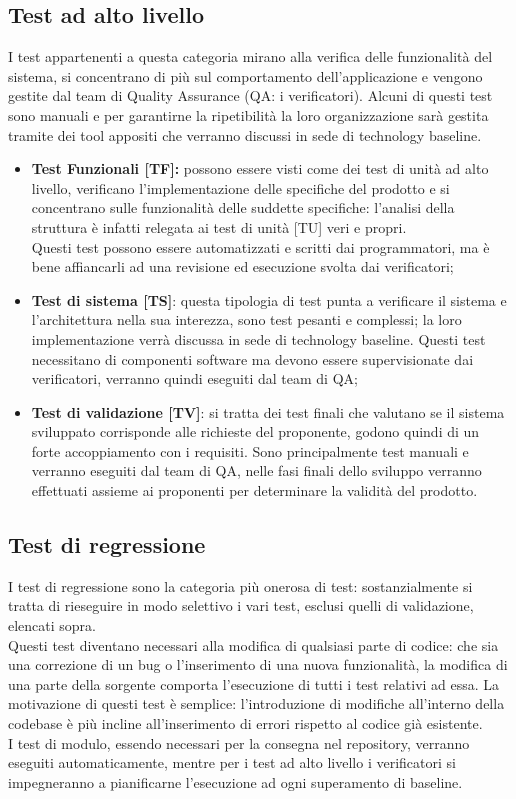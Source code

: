 \documentclass[PianoDiProgetto.tex]{subfiles}
\begin{document}
\subsection{Test ad alto livello}
I test appartenenti a questa categoria mirano alla verifica delle funzionalità del sistema, si concentrano di più sul comportamento dell'applicazione e vengono gestite dal team di Quality Assurance (QA: i verificatori).
Alcuni di questi test sono manuali e per garantirne la ripetibilità la loro organizzazione sarà gestita tramite dei tool appositi che verranno discussi in sede di technology baseline.
\begin{itemize}
	\item \textbf{Test Funzionali [TF]:} possono essere visti come dei test di unità ad alto livello, verificano l'implementazione delle specifiche del prodotto e si concentrano sulle funzionalità delle suddette specifiche: l'analisi della struttura è infatti relegata ai test di unità [TU] veri e propri. \\
	Questi test possono essere automatizzati e scritti dai programmatori, ma è bene affiancarli ad una revisione ed esecuzione svolta dai verificatori;
	\item \textbf{Test di sistema [TS]}: questa tipologia di test punta a verificare il sistema e l'architettura nella sua interezza, sono test pesanti e complessi; la loro implementazione verrà discussa in sede di technology baseline. 
	Questi test necessitano di componenti software ma devono essere supervisionate dai verificatori, verranno quindi eseguiti dal team di QA;
	\item \textbf{Test di validazione [TV]}: si tratta dei test finali che valutano se il sistema sviluppato corrisponde alle richieste del proponente, godono quindi di un forte accoppiamento con i requisiti. Sono principalmente test manuali e verranno eseguiti dal team di QA, nelle fasi finali dello sviluppo verranno effettuati assieme ai proponenti per determinare la validità del prodotto.
\end{itemize}

\subsection{Test di regressione}
I test di regressione sono la categoria più onerosa di test: sostanzialmente si tratta di rieseguire in modo selettivo i vari test, esclusi quelli di validazione, elencati sopra.\\
Questi test diventano necessari alla modifica di qualsiasi parte di codice: che sia una correzione di un bug o l'inserimento di una nuova funzionalità, la modifica di una parte della sorgente comporta l'esecuzione di tutti i test relativi ad essa. La motivazione di questi test è semplice: l'introduzione di modifiche all'interno della codebase è più incline all'inserimento di errori rispetto al codice già esistente.\\
I test di modulo, essendo necessari per la consegna nel repository, verranno eseguiti automaticamente, mentre per i test ad alto livello i verificatori si impegneranno a pianificarne l'esecuzione ad ogni superamento di baseline.
	
\end{document}
